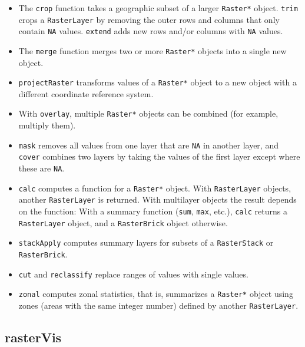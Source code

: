 \documentclass[smallroyalvopaper]{memoir}
\begin{document}
\begin{itemize}
\item The \texttt{crop} function takes a geographic subset of a larger \texttt{Raster*} object. \texttt{trim} crops a \texttt{RasterLayer} by removing the outer rows and columns that only contain \texttt{NA} values. \texttt{extend} adds new rows and/or columns with \texttt{NA} values.

\item The \texttt{merge} function merges two or more \texttt{Raster*} objects into a single new object.

\item \texttt{projectRaster} transforms values of a \texttt{Raster*} object to a new object with a different coordinate reference system.

\item With \texttt{overlay}, multiple \texttt{Raster*} objects can be combined (for example, multiply them).

\item \texttt{mask} removes all values from one layer that are \texttt{NA} in another layer, and \texttt{cover} combines two layers by taking the values of the first layer except where these are \texttt{NA}.

\item \texttt{calc} computes a function for a \texttt{Raster*} object. With \texttt{RasterLayer} objects, another \texttt{RasterLayer} is returned. With multilayer objects the result depends on the function: With a summary function (\texttt{sum}, \texttt{max}, etc.), \texttt{calc} returns a \texttt{RasterLayer} object, and a \texttt{RasterBrick} object otherwise.

\item \texttt{stackApply} computes summary layers for subsets of a \texttt{RasterStack} or \texttt{RasterBrick}.

\item \texttt{cut} and \texttt{reclassify} replace ranges of values with single values.

\item \texttt{zonal} computes zonal statistics, that is, summarizes a \texttt{Raster*} object using zones (areas with the same integer number) defined by another \texttt{RasterLayer}.
\end{itemize}

\subsection{rasterVis}
\label{sec:org9e346ea}
\label{sec:rasterVis}
\end{document}
